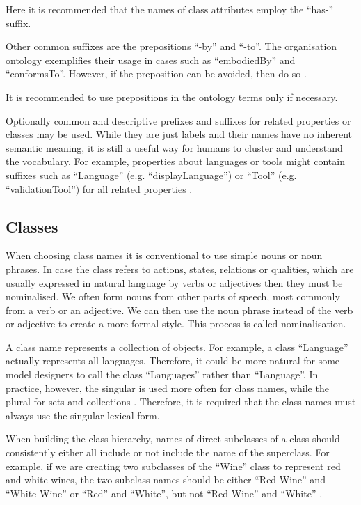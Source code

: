 	Here it is recommended that the names of class attributes employ the ``has-'' suffix.
	
	Other common suffixes are the prepositions ``-by'' and ``-to''. The organisation ontology \citep{org-ontology} exemplifies their usage in cases such as ``embodiedBy'' and ``conformsTo''. However, if the preposition can be avoided, then do so \cite{d3.1-2015}.
	
	It is recommended to use prepositions in the ontology terms only if necessary.
	
	Optionally common and descriptive prefixes and suffixes for related properties or classes may be used. While they are just labels and their names have no inherent semantic meaning, it is still a useful way for humans to cluster and understand the vocabulary. For example, properties about languages or tools might contain suffixes such as ``Language'' (e.g. ``displayLanguage'') or ``Tool'' (e.g. ``validationTool'') for all related properties \cite{d2.01-2017}.
	
	\subsection{Classes}
	\label{sec:classes}
	
	When choosing class names it is conventional to use simple nouns or noun phrases. In case the class refers to actions, states, relations or qualities, which are usually expressed in natural language by verbs or adjectives then they must be nominalised. We often form nouns from other parts of speech, most commonly from a verb or an adjective. We can then use the noun phrase instead of the verb or adjective to create a more formal style. This process is called nominalisation. 
	
	A class name represents a collection of objects. For example, a class ``Language'' actually represents all languages. Therefore, it could be more natural for some model designers to call the class ``Languages'' rather than ``Language''. In practice, however, the singular is used more often for class names, while the plural for sets and collections \cite{noy2001}. Therefore, it is required that the class names must always use the singular lexical form. 
	
	When building the class hierarchy, names of direct subclasses of a class should consistently either all include or not include the name of the superclass. For example, if we are creating two subclasses of the ``Wine'' class to represent red and white wines, the two subclass names should be either ``Red Wine'' and ``White Wine'' or ``Red'' and ``White'', but not ``Red Wine'' and ``White'' \cite{noy2001}.
	
